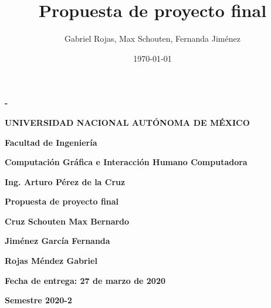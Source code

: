 \documentclass[12pt]{article} %
\title{Propuesta de proyecto final}
\author{Gabriel Rojas, Max Schouten, Fernanda Jiménez}
\date{\today}
\begin{document}
	\begin{titlepage}
		\thispagestyle{fancy}
		\centering
		{\bfseries - \par}
		\vspace{1cm}
		{\bfseries\LARGE UNIVERSIDAD NACIONAL AUTÓNOMA DE MÉXICO \par}
		\vspace{1cm}
		{\bfseries\LARGE Facultad de Ingeniería \par}
		\vspace{1cm}
		{\bfseries\LARGE Computación Gráfica e Interacción Humano Computadora \par}
		\vspace{1cm}
		{\bfseries\LARGE Ing. Arturo Pérez de la Cruz \par}
		\vspace{1cm}
		{\bfseries\LARGE Propuesta de proyecto final \par}
		\vspace{1cm}
		{\bfseries\LARGE Cruz Schouten Max Bernardo \par}
		{\bfseries\LARGE Jiménez García Fernanda \par}
		{\bfseries\LARGE Rojas Méndez Gabriel \par}
		\vspace{1cm}
		{\bfseries\LARGE Fecha de entrega: 27 de marzo de 2020 \par}
		\vspace{1cm}
		{\bfseries\LARGE Semestre 2020-2 \par}
	\end{titlepage}
\end{document}
